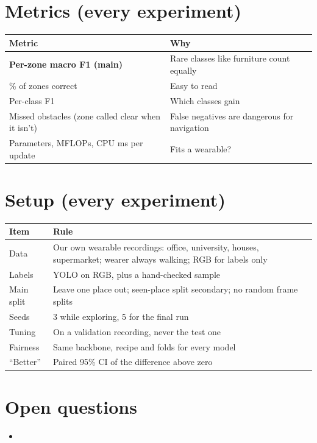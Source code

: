 \documentclass[11pt,a4paper]{article}
\begin{document}
\section*{Metrics (every experiment)}
{\small
\begin{tabularx}{\textwidth}{@{}L{6cm} Y@{}}
\toprule
\textbf{Metric} & \textbf{Why} \\
\midrule
\textbf{Per-zone macro F1 (main)} & Rare classes like furniture count equally \\
\% of zones correct & Easy to read \\
Per-class F1 & Which classes gain \\
Missed obstacles (zone called clear when it isn't) & False negatives are dangerous for navigation \\
Parameters, MFLOPs, CPU ms per update & Fits a wearable? \\
\bottomrule
\end{tabularx}
}

\section*{Setup (every experiment)}
{\small
\begin{tabularx}{\textwidth}{@{}L{3cm} Y@{}}
\toprule
\textbf{Item} & \textbf{Rule} \\
\midrule
Data & Our own wearable recordings: office, university, houses, supermarket; wearer always walking; RGB for labels only \\
Labels & YOLO on RGB, plus a hand-checked sample \\
Main split & Leave one place out; seen-place split secondary; no random frame splits \\
Seeds & 3 while exploring, 5 for the final run \\
Tuning & On a validation recording, never the test one \\
Fairness & Same backbone, recipe and folds for every model \\
``Better'' & Paired 95\% CI of the difference above zero \\
\bottomrule
\end{tabularx}
}

\section*{Open questions}
\begin{itemize}
  \item 
\end{itemize}
\end{document}
